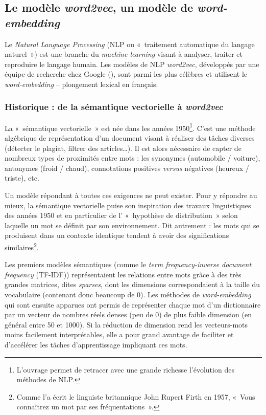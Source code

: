 \documentclass[11pt,french,french]{article}
\let\rmarkdownfootnote\footnote%
\def\footnote{\protect\rmarkdownfootnote}
\begin{document}
\hypertarget{le-moduxe8le-word2vec-un-moduxe8le-de-word-embedding}{%
\subsection{\texorpdfstring{Le modèle \emph{word2vec}, un modèle de \emph{word-embedding}}{Le modèle word2vec, un modèle de word-embedding}}\label{le-moduxe8le-word2vec-un-moduxe8le-de-word-embedding}}

Le \emph{Natural Language Processing} (NLP ou «~traitement automatique du langage naturel~») est une branche du \emph{machine learning} visant à analyser, traiter et reproduire le langage humain.
Les modèles de NLP \emph{word2vec}, développés par une équipe de recherche chez Google (\cite{Mikolov}), sont parmi les plus célèbres et utilisent le \emph{word-embedding} -- plongement lexical en français.

\hypertarget{historique-de-la-suxe9mantique-vectorielle-uxe0-word2vec}{%
\subsubsection{\texorpdfstring{Historique : de la sémantique vectorielle à \emph{word2vec}}{Historique : de la sémantique vectorielle à word2vec}}\label{historique-de-la-suxe9mantique-vectorielle-uxe0-word2vec}}

La «~sémantique vectorielle~» est née dans les années 1950\footnote{L'ouvrage \cite{Jurafsky} permet de retracer avec une grande richesse l'évolution des méthodes de NLP.}.
C'est une méthode algébrique de représentation d'un document visant à réaliser des tâches diverses (détecter le plagiat, filtrer des articles\dots).
Il est alors nécessaire de capter de nombreux types de proximités entre mots : les synonymes (automobile / voiture), antonymes (froid / chaud), connotations positives \emph{versus} négatives (heureux / triste), etc.

Un modèle répondant à toutes ces exigences ne peut exister.
Pour y répondre au mieux, la sémantique vectorielle puise son inspiration des travaux linguistiques des années 1950 et en particulier de l' «~hypothèse de distribution~» selon laquelle un mot se définit par son environnement.
Dit autrement : les mots qui se produisent dans un contexte identique tendent à avoir des significations similaires\footnote{Comme l'a écrit le linguiste britannique John Rupert Firth en 1957, «~Vous connaîtrez un mot par ses fréquentations~».}.

Les premiers modèles sémantiques (comme le \emph{term frequency-inverse document frequency} (TF-IDF)) représentaient les relations entre mots grâce à des très grandes matrices, dites \emph{sparses}, dont les dimensions correspondaient à la taille du vocabulaire (contenant donc beaucoup de 0). Les méthodes de \emph{word-embedding} qui sont ensuite apparues ont permis de représenter chaque mot d'un dictionnaire par un vecteur de nombres réels denses (peu de 0) de plus faible dimension (en général entre 50 et 1000).
Si la réduction de dimension rend les vecteurs-mots moins facilement interprétables, elle a pour grand avantage de faciliter et d'accélérer les tâches d'apprentissage impliquant ces mots.
\end{document}
